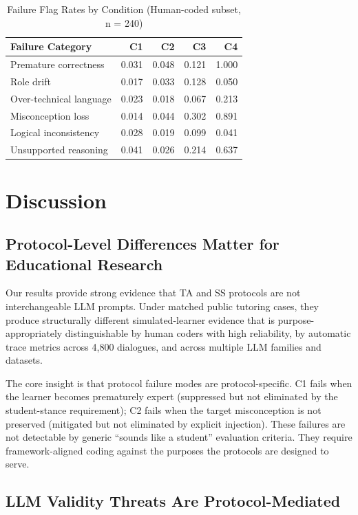 \documentclass[12pt]{article}
\begin{document}
\begin{table}[h]
\centering
\caption{Failure Flag Rates by Condition (Human-coded subset, n = 240)}
\label{tab:failures}
\begin{tabular}{lrrrr}
\toprule
Failure Category & C1 & C2 & C3 & C4 \\
\midrule
Premature correctness & 0.031 & 0.048 & 0.121 & 1.000 \\
Role drift & 0.017 & 0.033 & 0.128 & 0.050 \\
Over-technical language & 0.023 & 0.018 & 0.067 & 0.213 \\
Misconception loss & 0.014 & 0.044 & 0.302 & 0.891 \\
Logical inconsistency & 0.028 & 0.019 & 0.099 & 0.041 \\
Unsupported reasoning & 0.041 & 0.026 & 0.214 & 0.637 \\
\bottomrule
\end{tabular}
\end{table}

\section{Discussion}

\subsection{Protocol-Level Differences Matter for Educational Research}

Our results provide strong evidence that TA and SS protocols are not interchangeable
LLM prompts. Under matched public tutoring cases, they produce structurally different
simulated-learner evidence that is purpose-appropriately distinguishable by human coders
with high reliability, by automatic trace metrics across 4,800 dialogues, and across
multiple LLM families and datasets.

The core insight is that protocol failure modes are protocol-specific. C1 fails when the
learner becomes prematurely expert (suppressed but not eliminated by the student-stance
requirement); C2 fails when the target misconception is not preserved (mitigated but not
eliminated by explicit injection). These failures are not detectable by generic
``sounds like a student'' evaluation criteria. They require framework-aligned coding
against the purposes the protocols are designed to serve.

\subsection{LLM Validity Threats Are Protocol-Mediated}
\end{document}
